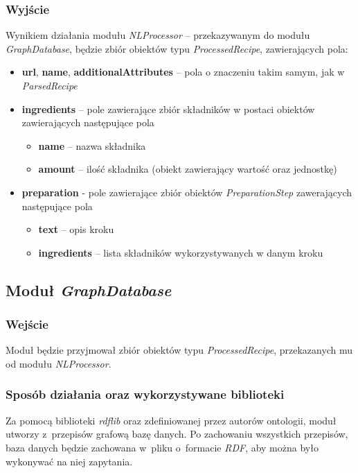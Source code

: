 \documentclass[11pt,a4paper]{article}
\begin{document}
\subsubsection{Wyjście}
Wynikiem działania modułu \textit{NLProcessor} -- przekazywanym do modułu \textit{GraphDatabase}, będzie zbiór obiektów typu \textit{ProcessedRecipe}, zawierających pola:
\begin{itemize}
  \item \textbf{url}, \textbf{name}, \textbf{additionalAttributes} -- pola o znaczeniu takim samym, jak w \textit{ParsedRecipe}
  \item \textbf{ingredients} -- pole zawierające zbiór składników w postaci obiektów zawierających następujące pola
  \begin{itemize}
    \item \textbf{name} -- nazwa składnika
    \item \textbf{amount} -- ilość składnika (obiekt zawierający wartość oraz jednostkę)
  \end{itemize}
  \item \textbf{preparation} - pole zawierające zbiór obiektów \textit{PreparationStep} zawerających następujące pola
    \begin{itemize}
    \item \textbf{text} -- opis kroku
    \item \textbf{ingredients} -- lista składników wykorzystywanych w danym kroku
  \end{itemize}
\end{itemize}

\subsection{Moduł \textit{GraphDatabase}}
\subsubsection{Wejście}
Moduł będzie przyjmował zbiór obiektów typu \textit{ProcessedRecipe}, przekazanych mu od modułu \textit{NLProcessor}.
\subsubsection{Sposób działania oraz wykorzystywane biblioteki}
Za pomocą biblioteki \textit{rdflib} oraz zdefiniowanej przez autorów ontologii, moduł utworzy z~przepisów grafową bazę danych. Po zachowaniu wszystkich przepisów, baza danych będzie zachowana w~pliku o~formacie \textit{RDF}, aby można było wykonywać na niej zapytania.
\end{document}
